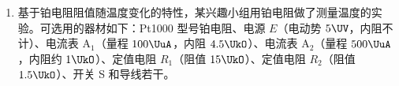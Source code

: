 \documentclass[\gkver]{gaokaozhenti}
\begin{document}
\begin{enumerate}
完成下列填空：
\begin{enumerate}
\item
表格中 a 处的数据为 （保留 3 位有效数字）；
\item
其它条件不变时，在实验误差允许的范围内，滑动摩擦力的大小与接触面上压力的大小 ，$\mu$ 与接触面上压力的大小 （以上两空填“成正比”“成反比”或“无关”）；
\item
若在实验过程中未进行步骤②，实验装置如图~\ref{2025云南11b}所示，挂钩高于定滑轮，则 $\mu$ 的测量结果将 （填“偏大”“偏小”或“不变”）。
\end{enumerate}



\item
基于铂电阻阻值随温度变化的特性，某兴趣小组用铂电阻做了测量温度的实验。可选用的器材如下：Pt1000 型号铂电阻、电源 $E$（电动势 $5 \UV$，内阻不计）、电流表 A$_{1}$（量程 $100 \UuA$，内阻 $4.5 \UkO$）、电流表 A$_{2}$（量程 $500 \UuA$，内阻约 $1 \UkO$）、定值电阻 $R_{1}$（阻值 $15 \UkO$）、定值电阻 $R_{2}$（阻值 $1.5 \UkO$）、开关 S 和导线若干。


\end{enumerate}
\end{document}
